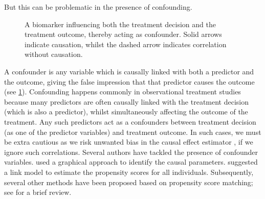 \documentclass[preprint,12pt]{elsarticle}
\begin{document}
But this
can be problematic in the presence of confounding.
\begin{figure}
\begin{center}
\end{center}
\caption{A biomarker influencing both the treatment decision and the treatment outcome, thereby acting as confounder. Solid arrows indicate causation, whilst the dashed arrow indicates correlation without causation.}
\label{fig:confounding}
\end{figure}
A confounder is any variable which is causally linked with both a predictor and the outcome, giving the false impression that that predictor causes the outcome (see \cref{fig:confounding}).
Confounding happens commonly in observational treatment studies because many predictors are often causally linked with the treatment decision (which is also a predictor), whilst simultaneously affecting the outcome of the treatment. Any such predictors act as a confounders between treatment decision (as one of the predictor variables) and treatment outcome.
In such cases, we must be extra cautious as we risk
unwanted bias in the causal effect estimator \citep{rosenbaum83},
if we ignore such correlations.
Several authors have tackled the presence of
confounder variables. 
 used a graphical
approach to identify the causal parameters.
 suggested a link model to estimate
the propensity scores for all individuals. Subsequently, several other
methods have been proposed based on propensity score matching;
see \citep{winship99,stuart10} for a brief review.
\end{document}
